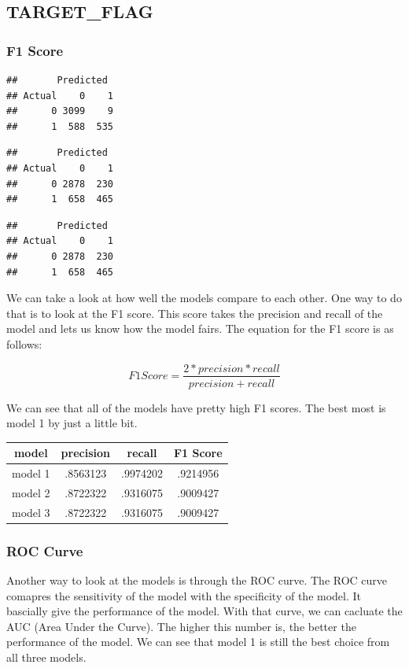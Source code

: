 \documentclass[]{article}
\begin{document}
\subsection{TARGET\_FLAG}\label{targetux5fflag-1}

\subsubsection{F1 Score}\label{f1-score}

\begin{verbatim}
##       Predicted
## Actual    0    1
##      0 3099    9
##      1  588  535
\end{verbatim}

\begin{verbatim}
##       Predicted
## Actual    0    1
##      0 2878  230
##      1  658  465
\end{verbatim}

\begin{verbatim}
##       Predicted
## Actual    0    1
##      0 2878  230
##      1  658  465
\end{verbatim}

We can take a look at how well the models compare to each other. One way
to do that is to look at the F1 score. This score takes the precision
and recall of the model and lets us know how the model fairs. The
equation for the F1 score is as follows:

\[
    F1 Score = \frac{2*precision*recall}{precision + recall}
  \]

We can see that all of the models have pretty high F1 scores. The best
most is model 1 by just a little bit.

\begin{tabular}{ c | c | c | c }
model & precision & recall & F1 Score \\
\hline
model 1 & .8563123 & .9974202 & .9214956 \\
\hline
model 2 & .8722322 & .9316075 & .9009427 \\
\hline
model 3 & .8722322 & .9316075 & .9009427 \\
\end{tabular}

\subsubsection{ROC Curve}\label{roc-curve}

Another way to look at the models is through the ROC curve. The ROC
curve comapres the sensitivity of the model with the specificity of the
model. It bascially give the performance of the model. With that curve,
we can cacluate the AUC (Area Under the Curve). The higher this number
is, the better the performance of the model. We can see that model 1 is
still the best choice from all three models.
\end{document}
